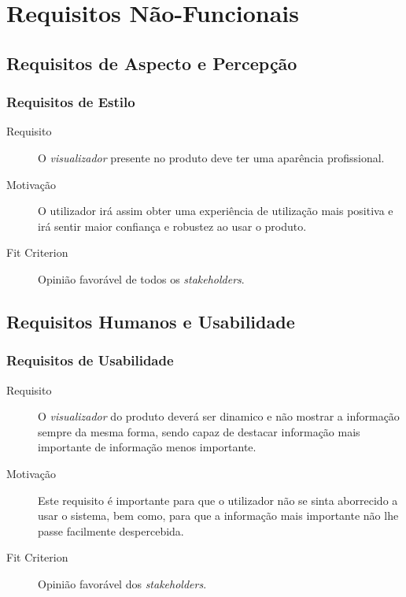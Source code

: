 \chapter{Requisitos Não-Funcionais}
\minitoc

\section{Requisitos de Aspecto e Percepção}


\subsection{Requisitos de Estilo}
\begin{description}
\item[Requisito] O \emph{visualizador} presente no produto deve ter uma aparência profissional.
\item[Motivação] O utilizador irá assim obter uma experiência de utilização mais positiva e irá sentir maior confiança e robustez
ao usar o produto.
\item[Fit Criterion] Opinião favorável de todos os \emph{stakeholders}.
\end{description}






\section{Requisitos Humanos e Usabilidade}
\subsection{Requisitos de Usabilidade}
\begin{description}
\item[Requisito] O \emph{visualizador} do produto deverá ser dinamico e não mostrar a informação sempre da mesma forma, sendo capaz de destacar informação mais importante de informação menos importante.
\item[Motivação] Este requisito é importante para que o utilizador não se sinta aborrecido a usar o sistema, bem como, 
para que a informação mais importante não lhe passe facilmente despercebida.  
\item[Fit Criterion] Opinião favorável dos \emph{stakeholders}.
\end{description}


